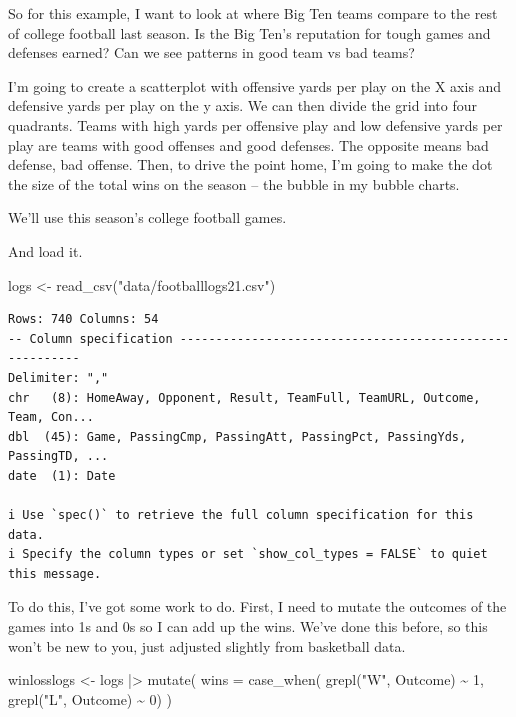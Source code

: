 \documentclass[
  letterpaper,
  DIV=11,
  numbers=noendperiod]{scrreprt}
\newenvironment{Shaded}{\begin{snugshade}}{\end{snugshade}}
\newcommand{\AttributeTok}[1]{\textcolor[rgb]{0.40,0.45,0.13}{#1}}
\newcommand{\DecValTok}[1]{\textcolor[rgb]{0.68,0.00,0.00}{#1}}
\newcommand{\FunctionTok}[1]{\textcolor[rgb]{0.28,0.35,0.67}{#1}}
\newcommand{\NormalTok}[1]{\textcolor[rgb]{0.00,0.23,0.31}{#1}}
\newcommand{\OtherTok}[1]{\textcolor[rgb]{0.00,0.23,0.31}{#1}}
\newcommand{\SpecialCharTok}[1]{\textcolor[rgb]{0.37,0.37,0.37}{#1}}
\newcommand{\StringTok}[1]{\textcolor[rgb]{0.13,0.47,0.30}{#1}}
\begin{document}
So for this example, I want to look at where Big Ten teams compare to
the rest of college football last season. Is the Big Ten's reputation
for tough games and defenses earned? Can we see patterns in good team vs
bad teams?

I'm going to create a scatterplot with offensive yards per play on the X
axis and defensive yards per play on the y axis. We can then divide the
grid into four quadrants. Teams with high yards per offensive play and
low defensive yards per play are teams with good offenses and good
defenses. The opposite means bad defense, bad offense. Then, to drive
the point home, I'm going to make the dot the size of the total wins on
the season -- the bubble in my bubble charts.

We'll use this season's college football games.

And load it.

\begin{Shaded}
\begin{Highlighting}[]
\NormalTok{logs }\OtherTok{\textless{}{-}} \FunctionTok{read\_csv}\NormalTok{(}\StringTok{"data/footballlogs21.csv"}\NormalTok{)}
\end{Highlighting}
\end{Shaded}

\begin{verbatim}
Rows: 740 Columns: 54
-- Column specification --------------------------------------------------------
Delimiter: ","
chr   (8): HomeAway, Opponent, Result, TeamFull, TeamURL, Outcome, Team, Con...
dbl  (45): Game, PassingCmp, PassingAtt, PassingPct, PassingYds, PassingTD, ...
date  (1): Date

i Use `spec()` to retrieve the full column specification for this data.
i Specify the column types or set `show_col_types = FALSE` to quiet this message.
\end{verbatim}

To do this, I've got some work to do. First, I need to mutate the
outcomes of the games into 1s and 0s so I can add up the wins. We've
done this before, so this won't be new to you, just adjusted slightly
from basketball data.

\begin{Shaded}
\begin{Highlighting}[]
\NormalTok{winlosslogs }\OtherTok{\textless{}{-}}\NormalTok{ logs }\SpecialCharTok{|\textgreater{}} 
  \FunctionTok{mutate}\NormalTok{(}
    \AttributeTok{wins =} \FunctionTok{case\_when}\NormalTok{(}
      \FunctionTok{grepl}\NormalTok{(}\StringTok{"W"}\NormalTok{, Outcome) }\SpecialCharTok{\textasciitilde{}} \DecValTok{1}\NormalTok{, }
      \FunctionTok{grepl}\NormalTok{(}\StringTok{"L"}\NormalTok{, Outcome) }\SpecialCharTok{\textasciitilde{}} \DecValTok{0}\NormalTok{)}
\NormalTok{)}
\end{Highlighting}
\end{Shaded}
\end{document}
